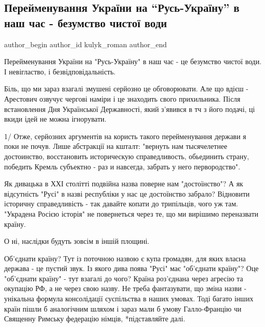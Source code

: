  
 
 
 
 
 
\subsection{Перейменування України на \enquote{Русь-Україну} в наш час - безумство чистої води}
\label{sec:03_09_2021.fb.kulyk_roman.1.ukraina_rusj_bezumstvo}
 
\ifcmt
 author_begin
   author_id kulyk_roman
 author_end
\fi

Перейменування України на "Русь-Україну" в наш час - це безумство чистої води.
І невігластво, і безвідповідальність.

Біль, що ми зараз взагалі змушені серйозно це обговорювати. Але що вдієш -
Арестович озвучує чергові наміри і це знаходить свого прихильника. Після
встановлення Дня Української Державності, який з'явився в тч з його подачі, ці
вкиди ідей не можна ігнорувати.

1/ Отже, серйозних аргументів на користь такого перейменування держави я поки
не почув. Лише абстракції на кшталт: "вернуть нам тысячелетнее достоинство,
восстановить историческую справедливость, обьединить страну, победить Кремль
субъектно - раз и навсегда, забрать у него первородство". 

Як дивацька в ХХІ столітті подвійна назва поверне нам "достоїнство"? А як
відсутність "Русі" в назві республіки у нас це достоїнство забрало? Відновити
історичну справедливість - так давайте копати до трипільців, чого уж там.
"Украдена Росією історія" не повернеться через те, що ми вирішимо переназвати
країну. 

О ні, наслідки будуть зовсім в іншій площині.

Об'єднати країну? Тут із поточною назвою є купа громадян, для яких власна
держава - це пустий звук. Із якого дива поява "Русі" має "об'єднати країну"?
Оце "об'єднати країну" - тут взагалі до чого? Країна роз'єднана через агресію
та окупацію РФ, а не через свою назву. Не треба фантазувати, що зміна назви -
унікальна формула консолідації суспільства в наших умовах. Тоді багато інших
країн пішли б аналогічним шляхом і зараз мали б умову Галло-Францію чи Священну
Римську федерацію німців, *підставляйте далі. 

